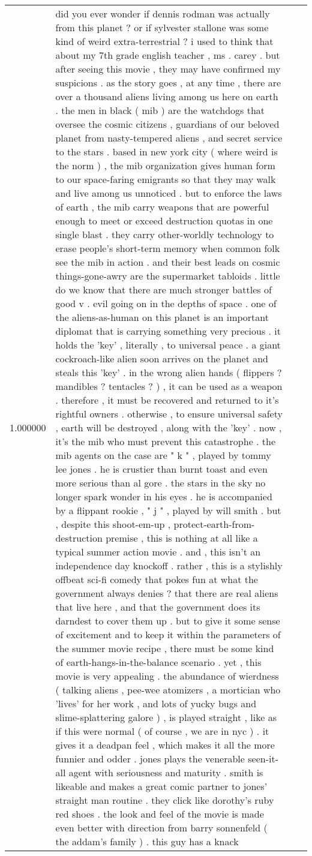 \begin{tabular}{r{1cm} p{0.4in} r{1cm} p{0.4in}}
1.000000 & did you ever wonder if dennis rodman was actually from this planet ?  or if sylvester stallone was some kind of weird extra-terrestrial ?  i used to think that about my 7th grade english teacher , ms . carey .  but after seeing this movie , they may have confirmed my suspicions .  as the story goes , at any time , there are over a thousand aliens living among us here on earth .  the men in black ( mib ) are the watchdogs that oversee the cosmic citizens , guardians of our beloved planet from nasty-tempered aliens , and secret service to the stars .  based in new york city ( where weird is the norm ) , the mib organization gives human form to our space-faring emigrants so that they may walk and live among us unnoticed .  but to enforce the laws of earth , the mib carry weapons that are powerful enough to meet or exceed destruction quotas in one single blast .  they carry other-worldly technology to erase people's short-term memory when common folk see the mib in action .  and their best leads on cosmic things-gone-awry are the supermarket tabloids .  little do we know that there are much stronger battles of good v . evil going on in the depths of space .  one of the aliens-as-human on this planet is an important diplomat that is carrying something very precious .  it holds the 'key' , literally , to universal peace .  a giant cockroach-like alien soon arrives on the planet and steals this 'key' .  in the wrong alien hands ( flippers ?  mandibles ?  tentacles ? ) , it can be used as a weapon .  therefore , it must be recovered and returned to it's rightful owners .  otherwise , to ensure universal safety , earth will be destroyed , along with the 'key' .  now , it's the mib who must prevent this catastrophe .  the mib agents on the case are " k " , played by tommy lee jones .  he is crustier than burnt toast and even more serious than al gore .  the stars in the sky no longer spark wonder in his eyes .  he is accompanied by a flippant rookie , " j " , played by will smith .  but , despite this shoot-em-up , protect-earth-from-destruction premise , this is nothing at all like a typical summer action movie .  and , this isn't an independence day knockoff .  rather , this is a stylishly offbeat sci-fi comedy that pokes fun at what the government always denies ? that there are real aliens that live here , and that the government does its darndest to cover them up .  but to give it some sense of excitement and to keep it within the parameters of the summer movie recipe , there must be some kind of earth-hangs-in-the-balance scenario .  yet , this movie is very appealing .  the abundance of wierdness ( talking aliens , pee-wee atomizers , a mortician who 'lives' for her work , and lots of yucky bugs and slime-splattering galore ) , is played straight , like as if this were normal ( of course , we are in nyc ) .  it gives it a deadpan feel , which makes it all the more funnier and odder .  jones plays the venerable seen-it-all agent with seriousness and maturity .  smith is likeable and makes a great comic partner to jones' straight man routine .  they click like dorothy's ruby red shoes .  the look and feel of the movie is made even better with direction from barry sonnenfeld ( the addam's family ) .  this guy has a knack 
\end{tabular}

